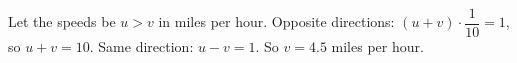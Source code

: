 Let the speeds be $u>v$ in miles per hour. Opposite directions: $(u+v)\cdot\dfrac1{10}=1$, so $u+v=10$. Same direction: $u-v=1$. So $v=\boxed{4.5}$ miles per hour.
